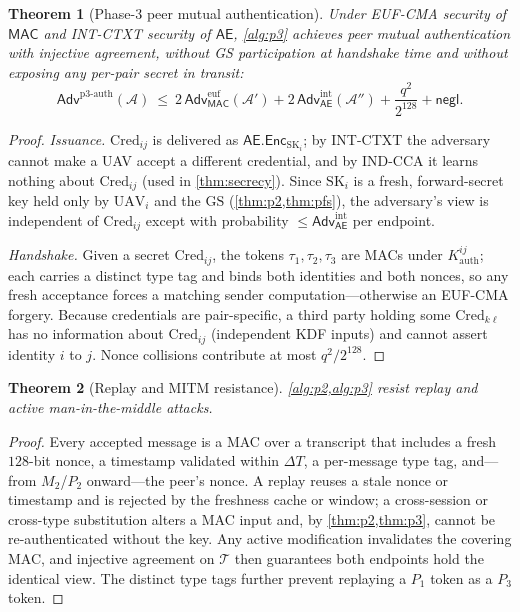 \documentclass[11pt,a4paper]{article}
\theoremstyle{jrnlplain}
\newtheorem{theorem}{Theorem}
\theoremstyle{jrnldef}
\newcommand{\GS}{\mathrm{GS}}
\newcommand{\UAV}{\mathrm{UAV}}
\newcommand{\Cred}{\mathrm{Cred}}
\newcommand{\SK}{\mathrm{SK}}
\newcommand{\MAC}{\mathsf{MAC}}
\newcommand{\aead}{\mathsf{AE}}
\newcommand{\Enc}{\mathsf{Enc}}
\newcommand{\adv}{\mathcal{A}}
\newcommand{\negl}{\mathsf{negl}}
\newcommand{\Adv}{\mathsf{Adv}}
\newcommand{\transcript}{\mathcal{T}}
\begin{document}
\begin{theorem}[Phase-3 peer mutual authentication]\label{thm:p3}
Under EUF-CMA security of $\MAC$ and INT-CTXT security of $\aead$,
\cref{alg:p3} achieves peer mutual authentication with injective agreement,
without GS participation at handshake time and without exposing any per-pair
secret in transit:
\begin{equation}
\Adv^{\mathrm{p3\text{-}auth}}(\adv)\ \le\
2\,\Adv^{\mathrm{euf}}_{\MAC}(\adv')
+2\,\Adv^{\mathrm{int}}_{\aead}(\adv'')
+\frac{q^2}{2^{128}}
+\negl.
\end{equation}
\end{theorem}
\begin{proof}
\emph{Issuance.} $\Cred_{ij}$ is delivered as $\aead.\Enc_{\SK_i}$; by
INT-CTXT the adversary cannot make a UAV accept a different credential, and by
IND-CCA it learns nothing about $\Cred_{ij}$ (used in \cref{thm:secrecy}).
Since $\SK_i$ is a fresh, forward-secret key held only by $\UAV_i$ and the
$\GS$ (\cref{thm:p2,thm:pfs}), the adversary's view is independent of
$\Cred_{ij}$ except with probability $\le\Adv^{\mathrm{int}}_{\aead}$ per
endpoint.

\emph{Handshake.} Given a secret $\Cred_{ij}$, the tokens
$\tau_1,\tau_2,\tau_3$ are MACs under $K^{ij}_{\mathrm{auth}}$; each carries a
distinct type tag and binds both identities and both nonces, so any fresh
acceptance forces a matching sender computation---otherwise an EUF-CMA
forgery. Because credentials are pair-specific, a third party holding some
$\Cred_{k\ell}$ has no information about $\Cred_{ij}$ (independent KDF inputs)
and cannot assert identity $i$ to $j$. Nonce collisions contribute at most
$q^2/2^{128}$.
\end{proof}

\begin{theorem}[Replay and MITM resistance]\label{thm:replay}
\cref{alg:p2,alg:p3} resist replay and active man-in-the-middle attacks.
\end{theorem}
\begin{proof}
Every accepted message is a MAC over a transcript that includes a fresh
$128$-bit nonce, a timestamp validated within $\Delta T$, a per-message type
tag, and---from $M_2$/$P_2$ onward---the peer's nonce. A replay reuses a stale
nonce or timestamp and is rejected by the freshness cache or window; a
cross-session or cross-type substitution alters a MAC input and, by
\cref{thm:p2,thm:p3}, cannot be re-authenticated without the key. Any active
modification invalidates the covering MAC, and injective agreement on
$\transcript$ then guarantees both endpoints hold the identical view. The
distinct type tags further prevent replaying a $P_1$ token as a $P_3$ token.
\end{proof}
\end{document}
